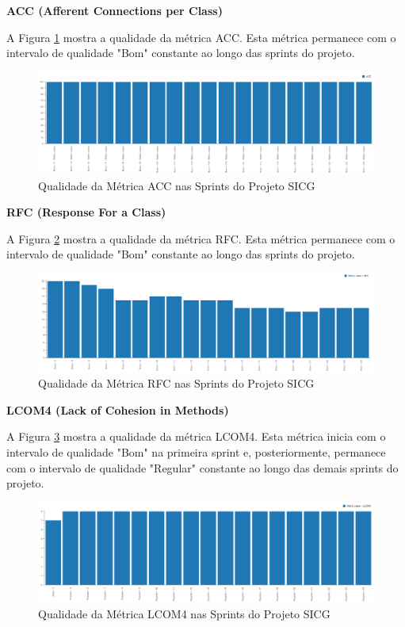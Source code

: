 \textbf{ACC (Afferent Connections per Class)}

A Figura \ref{acc} mostra a qualidade da métrica ACC. Esta métrica permanece com o intervalo de qualidade "Bom" constante ao longo das sprints do projeto.

\begin{figure}[H]
		\centering
			\includegraphics[scale=0.4]{figuras/acc.png}
		\caption{Qualidade da Métrica ACC nas Sprints do Projeto SICG}
		\label{acc}
\end{figure}

\textbf{RFC (Response For a Class)} 

A Figura \ref{rfc} mostra a qualidade da métrica RFC. Esta métrica permanece com o intervalo de qualidade "Bom" constante ao longo das sprints do projeto.

\begin{figure}[H]
		\centering
			\includegraphics[scale=0.4]{figuras/rfc.png}
		\caption{Qualidade da Métrica RFC nas Sprints do Projeto SICG}
		\label{rfc}
\end{figure}

\textbf{LCOM4 (Lack of Cohesion in Methods)} 

A Figura \ref{lcom4} mostra a qualidade da métrica LCOM4. Esta métrica inicia com o intervalo de qualidade "Bom" na primeira sprint e, posteriormente, permanece com o intervalo de qualidade "Regular" constante ao longo das demais sprints do projeto.

\begin{figure}[H]
		\centering
			\includegraphics[scale=0.4]{figuras/lcom4.png}
		\caption{Qualidade da Métrica LCOM4  nas Sprints do Projeto SICG}
		\label{lcom4}
\end{figure}

